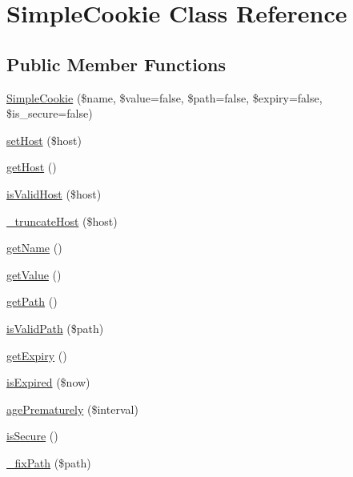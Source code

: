\hypertarget{class_simple_cookie}{
\section{SimpleCookie Class Reference}
\label{class_simple_cookie}
}
\subsection*{Public Member Functions}
\begin{DoxyCompactItemize}
\item 
\hyperlink{class_simple_cookie_adc2cfc15b096b46003e927a08d95e35b}{SimpleCookie} (\$name, \$value=false, \$path=false, \$expiry=false, \$is\_\-secure=false)
\item 
\hyperlink{class_simple_cookie_a8fdb8a634ffc188eaf881382b2cc2653}{setHost} (\$host)
\item 
\hyperlink{class_simple_cookie_a8139a318602091eacb73d2051324fe7b}{getHost} ()
\item 
\hyperlink{class_simple_cookie_a1a063235b39da20c35c4f07a6780b483}{isValidHost} (\$host)
\item 
\hyperlink{class_simple_cookie_aaaccae16ef83f62122331398d11673b3}{\_\-truncateHost} (\$host)
\item 
\hyperlink{class_simple_cookie_a45fba343cdf668ddd956b76ef79f8d58}{getName} ()
\item 
\hyperlink{class_simple_cookie_a27a060cd69b4abf9b9483d1b456ba806}{getValue} ()
\item 
\hyperlink{class_simple_cookie_a6b0897c1051d8ff8fa7f3b8e0c70d0ed}{getPath} ()
\item 
\hyperlink{class_simple_cookie_aa83733e9cf866c9711bf464088a292f5}{isValidPath} (\$path)
\item 
\hyperlink{class_simple_cookie_a076ae02773a20d34858bb34c628729bd}{getExpiry} ()
\item 
\hyperlink{class_simple_cookie_a7c04a5c207847236bcf64253e1b75b34}{isExpired} (\$now)
\item 
\hyperlink{class_simple_cookie_a1259e0fd03d9d4e10fabe075721daeb2}{agePrematurely} (\$interval)
\item 
\hyperlink{class_simple_cookie_a3eec5b38d439a40df2540e3040ca4849}{isSecure} ()
\item 
\hyperlink{class_simple_cookie_a873874781143075ad0874c076b658bff}{\_\-fixPath} (\$path)
\end{DoxyCompactItemize}
